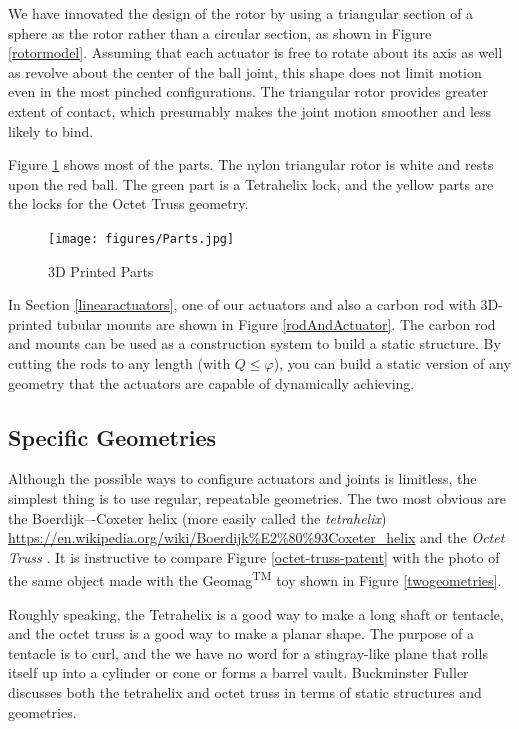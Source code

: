 \documentclass[11pt]{article}
\begin{document}
 We have innovated the design of the rotor by using a triangular section of a sphere as the
 rotor rather than a circular section, as shown in Figure \ref{rotormodel}.
 Assuming that each actuator is free to rotate about its axis as well as revolve about the
 center of the ball joint, this shape does not limit motion even in the most pinched
 configurations. The triangular rotor provides greater extent of contact,
 which presumably makes the joint motion
 smoother and less likely to bind.


 Figure \ref{parts} shows most of the parts. The nylon triangular rotor is white and rests upon
 the red ball. The green part is a Tetrahelix lock, and the yellow parts are the locks for the Octet Truss
 geometry.

\begin{figure}[H]
  \centering
    \texttt{[image: figures/Parts.jpg]}
    \caption[3D Printed Parts]{3D Printed Parts}
      \label{parts}
\end{figure}

In Section \ref{linearactuators}, one of our actuators and also a carbon rod with 3D-printed tubular mounts
are shown in Figure \ref{rodAndActuator}.
The carbon rod and mounts can be used as a construction system to build a static structure.
By cutting the rods to any length (with $Q \leq \varphi$), you can build a static version of any geometry that
the actuators
are capable of dynamically achieving.

\subsection{Specific Geometries}

Although the possible ways to configure actuators and joints is limitless, the simplest thing is to
use regular, repeatable geometries. The two most obvious are the Boerdijk–-Coxeter helix
(more easily called the \textit{tetrahelix})
\url{https://en.wikipedia.org/wiki/Boerdijk%E2%80%93Coxeter_helix}
  and the \emph{Octet Truss}
  \cite{richard1961synergetic}.
  It is instructive to compare Figure \ref{octet-truss-patent} with the photo of the same object
  made with the Geomag\textsuperscript{TM} toy shown in Figure \ref{twogeometries}.

Roughly speaking, the Tetrahelix is a good way to make a long shaft or tentacle, and the octet truss
is a good way to make a planar shape. The purpose of a tentacle is to curl, and the we have no word for
a stingray-like plane that rolls itself up into a cylinder or cone or forms a barrel vault. Buckminster Fuller discusses
both the tetrahelix and octet truss \cite{fuller1982synergetics} in terms of static structures and geometries.
\end{document}

